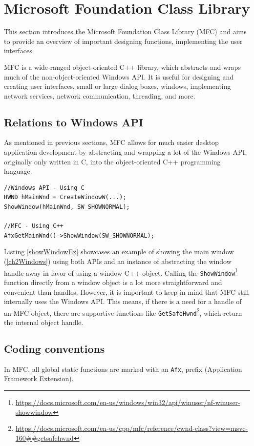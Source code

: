 \section{Microsoft Foundation Class Library}
This section introduces the Microsoft Foundation Class Library (MFC) and aims to provide an overview of important designing functions, implementing the user interfaces.

MFC is a wide-ranged object-oriented C++ library, which abstracts and wraps much of the non-object-oriented Windows API. It is useful for designing and creating user interfaces, small or large dialog boxes, windows, implementing network services, network communication, threading, and more.\cite{MFCDesktop}

\subsection*{Relations to Windows API}
As mentioned in previous sections, MFC allows for much easier desktop application development by abstracting and wrapping a lot of the Windows API, originally only written in C, into the object-oriented C++ programming language.

\begin{lstlisting}[caption={Showing a window using Windows API and MFC}, label=showWindowEx]
//Windows API - Using C
HWND hMainWnd = CreateWindowW(...);
ShowWindow(hMainWnd, SW_SHOWNORMAL);

//MFC - Using C++
AfxGetMainWnd()->ShowWindow(SW_SHOWNORMAL);
\end{lstlisting}

Listing \ref{showWindowEx} showcases an example of showing the main window (\ref{ch2Windows}) using both APIs and an instance of abstracting the window handle away in favor of using a window C++ object. Calling the \lstinline{ShowWindow}\footnote{\url{https://docs.microsoft.com/en-us/windows/win32/api/winuser/nf-winuser-showwindow}} function directly from a window object is a lot more straightforward and convenient than handles. However, it is important to keep in mind that MFC still internally uses the Windows API.
This means, if there is a need for a handle of an MFC object, there are supportive functions like \lstinline{GetSafeHwnd}\footnote{\url{https://docs.microsoft.com/en-us/cpp/mfc/reference/cwnd-class?view=msvc-160##getsafehwnd}}, which return the internal object handle.

\subsection*{Coding conventions}
In MFC, all global static functions are marked with an \lstinline{Afx}, prefix (Application Framework Extension).

